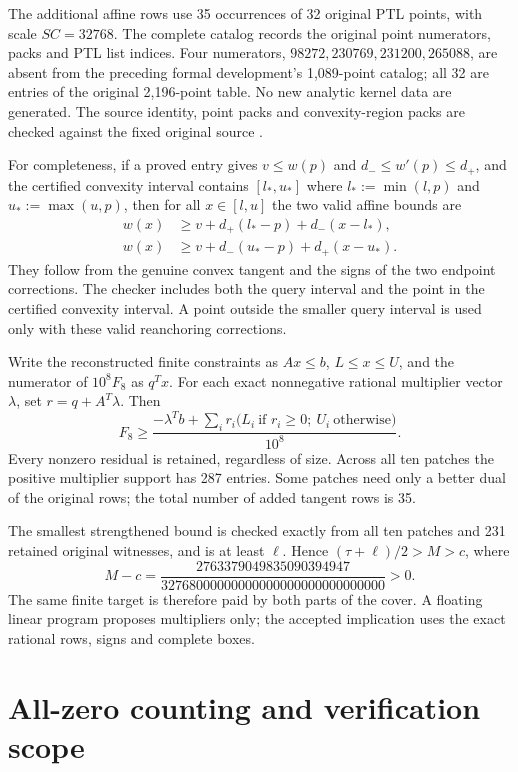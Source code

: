\documentclass[11pt,a4paper]{article}
\begin{document}
The additional affine rows use 35 occurrences of 32 original
PTL points, with scale $SC=32768$. The complete catalog records the
original point numerators, packs and PTL list indices. Four numerators,
$98272,230769,231200,265088$, are absent from the preceding formal
development's 1,089-point catalog; all 32 are entries of the original
2,196-point table. No new analytic kernel data are generated.
The source identity, point packs and convexity-region packs are
checked against the fixed original source \cite{PC8}.

For completeness, if a proved entry gives $v\le w(p)$ and
$d_-\le w'(p)\le d_+$, and the certified convexity interval contains
$[l_*,u_*]$ where $l_*:=\min(l,p)$ and $u_*:=\max(u,p)$, then for all
$x\in[l,u]$ the two valid affine bounds are
\[
 \begin{split}
 w(x)&\ge v+d_+(l_*-p)+d_-(x-l_*),\\
 w(x)&\ge v+d_-(u_*-p)+d_+(x-u_*).
 \end{split}
\]
They follow from the genuine convex tangent and the signs of the two
endpoint corrections. The checker includes both the query interval
and the point in the certified convexity interval. A point outside
the smaller query interval is used only with these valid reanchoring
corrections.

Write the reconstructed finite constraints as $Ax\le b$,
$L\le x\le U$, and the numerator of $10^8 F_8$ as $q^Tx$.
For each exact nonnegative rational multiplier vector $\lambda$, set
$r=q+A^T\lambda$. Then
\[
 F_8\ge\frac{-\lambda^Tb+
     \sum_i r_i\bigl(L_i\ \text{if }r_i\ge0;
                          \ U_i\ \text{otherwise}\bigr)}{10^8}.
\]
Every nonzero residual is retained, regardless of size. Across all
ten patches the positive multiplier support has 287 entries. Some
patches need only a better dual of the original rows; the total number
of added tangent rows is 35.

The smallest strengthened bound is checked exactly from all ten
patches and 231 retained original witnesses, and is at least $\ell$.
Hence $(\tau+\ell)/2>M>c$, where
\[
 M-c=
 \frac{2763379049835090394947}
      {32768000000000000000000000000000}>0.
\]
The same finite target is therefore paid by both parts of the cover.
A floating linear program proposes multipliers only; the accepted
implication uses the exact rational rows, signs and complete boxes.

\section{All-zero counting and verification scope}
\end{document}

